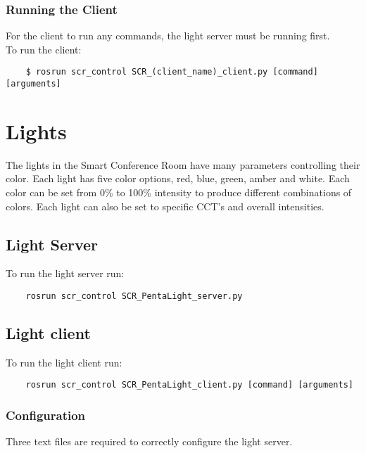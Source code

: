 \documentclass[twoside]{article}
\begin{document}
 	\subsubsection{Running the Client}
 	For the client to run any commands, the light server must be running first.\\
 	To run the client:
 	
 	\begin{verbatim}
 	$ rosrun scr_control SCR_(client_name)_client.py [command] [arguments]
 	\end{verbatim}
 	

 	
 	
 	
 	
 	
	\section{Lights}
	The lights in the Smart Conference Room have many parameters controlling their color. Each light has five color options, red, blue, green, amber and white. Each color can be set from 0\% to 100\% intensity to produce different combinations of colors. Each light can also be set to specific CCT's and overall intensities.
	
	\subsection{Light Server}
	To run the light server run:
	\begin{verbatim}
	rosrun scr_control SCR_PentaLight_server.py
	\end{verbatim}
	
	\subsection{Light client}
	To run the light client run:
	\begin{verbatim}
	rosrun scr_control SCR_PentaLight_client.py [command] [arguments]
	\end{verbatim}

	
	\subsubsection{Configuration}
	Three text files are required to correctly configure the light server.
	
\end{document}
